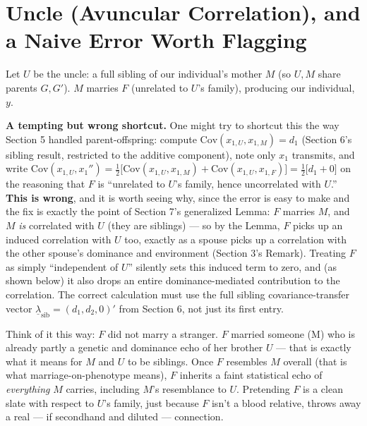 \documentclass[12pt]{article}
\begin{document}
\section{Uncle (Avuncular Correlation), and a Naive Error Worth Flagging}

Let $U$ be the uncle: a full sibling of our individual's mother $M$ (so $U,M$ share parents $G,G'$). $M$ marries $F$ (unrelated to $U$'s family), producing our individual, $y$.

\textbf{A tempting but wrong shortcut.} One might try to shortcut this the way Section 5 handled parent-offspring: compute $\mathrm{Cov}(x_{1,U},x_{1,M})=d_1$ (Section 6's sibling result, restricted to the additive component), note only $x_1$ transmits, and write $\mathrm{Cov}(x_{1,U},x_1'') = \tfrac12\big[\mathrm{Cov}(x_{1,U},x_{1,M})+\mathrm{Cov}(x_{1,U},x_{1,F})\big] = \tfrac12\big[d_1+0\big]$ on the reasoning that $F$ is ``unrelated to $U$'s family, hence uncorrelated with $U$.'' \textbf{This is wrong}, and it is worth seeing why, since the error is easy to make and the fix is exactly the point of Section 7's generalized Lemma: $F$ marries $M$, and $M$ \emph{is} correlated with $U$ (they are siblings) — so by the Lemma, $F$ picks up an induced correlation with $U$ too, exactly as a spouse picks up a correlation with the other spouse's dominance and environment (Section 3's Remark). Treating $F$ as simply ``independent of $U$'' silently sets this induced term to zero, and (as shown below) it also drops an entire dominance-mediated contribution to the correlation. The correct calculation must use the full sibling covariance-transfer vector $\underline\lambda_{\mathrm{sib}}=(d_1,d_2,0)'$ from Section 6, not just its first entry.

Think of it this way: $F$ did not marry a stranger. $F$ married someone (M) who is already partly a genetic and dominance echo of her brother $U$ — that is exactly what it means for $M$ and $U$ to be siblings. Once $F$ resembles $M$ overall (that is what marriage-on-phenotype means), $F$ inherits a faint statistical echo of \emph{everything} $M$ carries, including $M$'s resemblance to $U$. Pretending $F$ is a clean slate with respect to $U$'s family, just because $F$ isn't a blood relative, throws away a real — if secondhand and diluted — connection.
\end{document}
